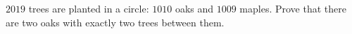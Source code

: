 $2019$ trees are planted in a circle: $1010$ oaks and $1009$ maples. Prove that there are two oaks with exactly two trees between them.
